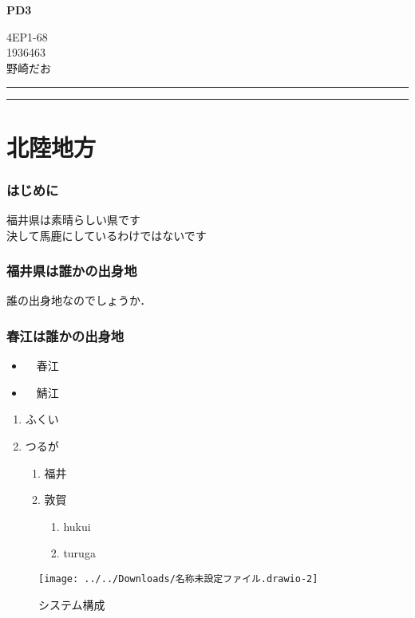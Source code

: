 \documentclass[uplatex]{jsarticle}
\begin{document}
	\begin{center}
		\textbf{PD3}
	\end{center}
	\begin{flushright}
		4EP1-68\\
		1936463\\
		野崎だお
	\end{flushright}
	\hrule
	\tableofcontents %
	\vspace{5mm}%
	\hrule%
	
	\part{北陸地方}
	\section{はじめに}
	福井県は素晴らしい県です\\決して馬鹿にしているわけではないです
	\section{福井県は誰かの出身地}
	誰の出身地なのでしょうか．
	\newpage
	\section{春江は誰かの出身地}

\begin{itemize}
	\item　春江
	\item　鯖江
\end{itemize}

\begin{enumerate}
	\item ふくい
	\item つるが
	\begin{enumerate}
		\item 福井
		\item 敦賀
		\begin{enumerate}
			\item hukui
			\item turuga
		\end{enumerate}
	\end{enumerate}
\end{enumerate}

\begin{figure}
	\centering
	\texttt{[image: ../../Downloads/名称未設定ファイル.drawio-2]}
	\caption{システム構成}
	\label{fig:}
\end{figure}
\end{document}
